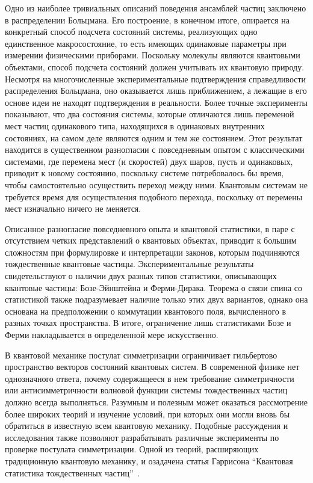 \documentclass[a4paper, 12pt]{article}
\begin{document}
Одно из наиболее тривиальных описаний поведения ансамблей частиц 
заключено в распределении Больцмана. Его построение, в конечном итоге, 
опирается на конкретный способ подсчета состояний системы, реализующих 
одно единственное макросостояние, то есть имеющих одинаковые параметры 
при измерении физическими приборами. Поскольку молекулы являются 
квантовыми объектами, способ подсчета состояний должен учитывать их 
квантовую природу. Несмотря на многочисленные экспериментальные 
подтверждения справедливости распределения Больцмана, оно оказывается 
лишь приближением, а лежащие в его основе идеи не находят подтверждения 
в реальности. Более точные эксперименты показывают, что два состояния 
системы, которые отличаются лишь переменой мест частиц одинакового типа, 
находящихся в одинаковых внутренних состояниях, на самом деле являются 
одним и тем же состоянием. Этот результат находится в существенном 
разногласии с повседневным опытом с классическими системами, где 
перемена мест (и скоростей) двух шаров, пусть и одинаковых, приводит 
к новому состоянию, поскольку системе потребовалось бы время, чтобы 
самостоятельно осуществить переход между ними. Квантовым системам не 
требуется время для осуществления подобного перехода, поскольку от 
перемены мест изначально ничего не меняется.

Описанное разногласие повседневного опыта и квантовой статистики, в паре 
с отсутствием четких представлений о квантовых объектах, приводит 
к большим сложностям при формулировке и интерпретации законов, которым 
подчиняются тождественные квантовые частицы. Экспериментальные 
результаты свидетельствуют о наличии двух разных типов статистики, 
описывающих квантовые частицы: Бозе-Эйнштейна и Ферми-Дирака. Теорема 
о связи спина со статистикой также подразумевает наличие только этих 
двух вариантов, однако она основана на предположении о коммутации 
квантового поля, вычисленного в разных точках пространства. В итоге, 
ограничение лишь статистиками Бозе и Ферми накладывается в определенной 
мере искусственно.

В квантовой механике постулат симметризации ограничивает гильбертово 
пространство векторов состояний квантовых систем. В современной физике 
нет однозначного ответа, почему содержащееся в нем требование 
симметричности или антисимметричности волновой функции системы 
тождественных частиц должно всегда выполняться. Разумным и полезным 
может оказаться рассмотрение более широких теорий и изучение условий, 
при которых они могли вновь бы обратиться в известную всем квантовую 
механику. Подобные рассуждения и исследования также позволяют 
разрабатывать различные эксперименты по проверке постулата 
симметризации. Одной из теорий, расширяющих традиционную квантовую 
механику, и озадачена статья Гаррисона ``Квантовая статистика 
тождественных частиц''~\cite{source}.
\end{document}
